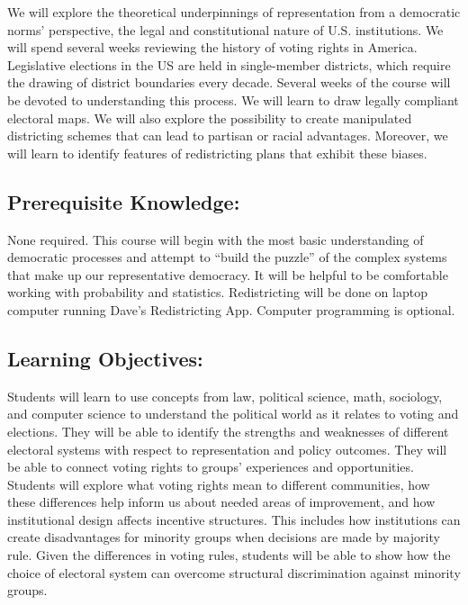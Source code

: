 \documentclass[
]{article}
\begin{document}
We will explore the theoretical underpinnings of representation from a
democratic norms' perspective, the legal and constitutional nature of
U.S. institutions. We will spend several weeks reviewing the history of
voting rights in America. Legislative elections in the US are held in
single-member districts, which require the drawing of district
boundaries every decade. Several weeks of the course will be devoted to
understanding this process. We will learn to draw legally compliant
electoral maps. We will also explore the possibility to create
manipulated districting schemes that can lead to partisan or racial
advantages. Moreover, we will learn to identify features of
redistricting plans that exhibit these biases.

\hypertarget{prerequisite-knowledge}{%
\subsection{Prerequisite Knowledge:}\label{prerequisite-knowledge}}

None required. This course will begin with the most basic understanding
of democratic processes and attempt to ``build the puzzle'' of the
complex systems that make up our representative democracy. It will be
helpful to be comfortable working with probability and statistics.
Redistricting will be done on laptop computer running Dave's
Redistricting App. Computer programming is optional.

\hypertarget{learning-objectives}{%
\subsection{Learning Objectives:}\label{learning-objectives}}

Students will learn to use concepts from law, political science, math,
sociology, and computer science to understand the political world as it
relates to voting and elections. They will be able to identify the
strengths and weaknesses of different electoral systems with respect to
representation and policy outcomes. They will be able to connect voting
rights to groups' experiences and opportunities. Students will explore
what voting rights mean to different communities, how these differences
help inform us about needed areas of improvement, and how institutional
design affects incentive structures. This includes how institutions can
create disadvantages for minority groups when decisions are made by
majority rule. Given the differences in voting rules, students will be
able to show how the choice of electoral system can overcome structural
discrimination against minority groups.
\end{document}
